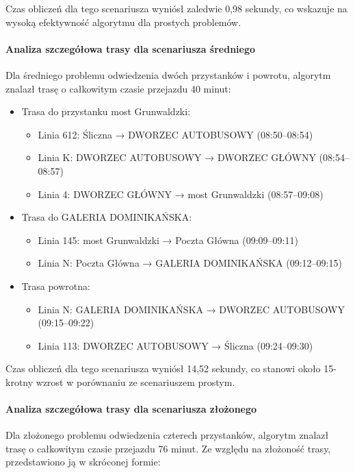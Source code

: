\documentclass[12pt,a4paper]{article}
\begin{document}
Czas obliczeń dla tego scenariusza wyniósł zaledwie 0,98 sekundy, co wskazuje na wysoką efektywność algorytmu dla prostych problemów.

\paragraph{Analiza szczegółowa trasy dla scenariusza średniego}
Dla średniego problemu odwiedzenia dwóch przystanków i powrotu, algorytm znalazł trasę o całkowitym czasie przejazdu 40 minut:

\begin{itemize}
    \item Trasa do przystanku most Grunwaldzki:
    \begin{itemize}
        \item Linia 612: Śliczna → DWORZEC AUTOBUSOWY (08:50--08:54)
        \item Linia K: DWORZEC AUTOBUSOWY → DWORZEC GŁÓWNY (08:54--08:57)
        \item Linia 4: DWORZEC GŁÓWNY → most Grunwaldzki (08:57--09:08)
    \end{itemize}
    \item Trasa do GALERIA DOMINIKAŃSKA:
    \begin{itemize}
        \item Linia 145: most Grunwaldzki → Poczta Główna (09:09--09:11)
        \item Linia N: Poczta Główna → GALERIA DOMINIKAŃSKA (09:12--09:15)
    \end{itemize}
    \item Trasa powrotna:
    \begin{itemize}
        \item Linia N: GALERIA DOMINIKAŃSKA → DWORZEC AUTOBUSOWY (09:15--09:22)
        \item Linia 113: DWORZEC AUTOBUSOWY → Śliczna (09:24--09:30)
    \end{itemize}
\end{itemize}

Czas obliczeń dla tego scenariusza wyniósł 14,52 sekundy, co stanowi około 15-krotny wzrost w porównaniu ze scenariuszem prostym.

\paragraph{Analiza szczegółowa trasy dla scenariusza złożonego}
Dla złożonego problemu odwiedzenia czterech przystanków, algorytm znalazł trasę o całkowitym czasie przejazdu 76 minut. Ze względu na złożoność trasy, przedstawiono ją w skróconej formie:
\end{document}
